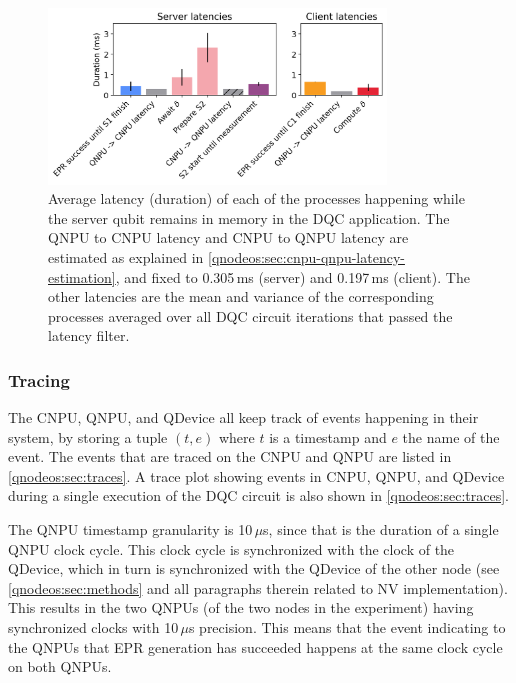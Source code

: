 \begin{figure}[t]
\centering
\includegraphics[width=0.8\textwidth]{figures/qnodeos/supplementary/plots/latencies_variance.png}
\caption{Average latency (duration) of each of the processes happening while the server qubit remains in memory in the \ac{DQC} application. The \ac{QNPU} to \ac{CNPU} latency and \ac{CNPU} to \ac{QNPU} latency are estimated as explained in \cref{qnodeos:sec:cnpu-qnpu-latency-estimation}, and fixed to 0.305\,ms (server) and 0.197\,ms (client). The other latencies are the mean and variance of the corresponding processes averaged over all \ac{DQC} circuit iterations that passed the latency filter.}
\label{qnodeos:fig:delcomp-latencies-variance}
\end{figure}

\subsubsection{Tracing}

The \ac{CNPU}, \ac{QNPU}, and \ac{QDevice} all keep track of events happening in their system, by storing a tuple $(t, e)$ where $t$ is a timestamp and $e$ the name of the event. The events that are traced on the \ac{CNPU} and \ac{QNPU} are listed in \cref{qnodeos:sec:traces}. A trace plot showing events in \ac{CNPU}, \ac{QNPU}, and \ac{QDevice} during a single execution of the \ac{DQC} circuit is also shown in \cref{qnodeos:sec:traces}.

The \ac{QNPU} timestamp granularity is 10\,$\mu$s, since that is the duration of a single \ac{QNPU} clock cycle. This clock cycle is synchronized with the clock of the \ac{QDevice}, which in turn is synchronized with the \ac{QDevice} of the other node (see \cref{qnodeos:sec:methods} and all paragraphs therein related to \ac{NV} implementation). This results in the two \acp{QNPU} (of the two nodes in the experiment) having synchronized clocks with 10\,$\mu$s precision. This means that the event indicating to the \acp{QNPU} that \ac{EPR} generation has succeeded happens at the same clock cycle on both \acp{QNPU}.

